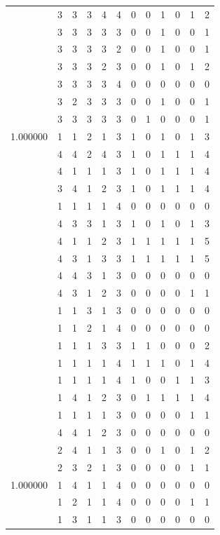 \documentclass[]{book}
\theoremstyle{definition}
\theoremstyle{definition}
\theoremstyle{definition}
\theoremstyle{remark}
\begin{document}
\begin{table}
{\begin{tabular}[t]{rrrrrrrrrrrr}
 & 3 & 3 & 3 & 4 & 4 & 0 & 0 & 1 & 0 & 1 & 2\\
 & 3 & 3 & 3 & 3 & 3 & 0 & 0 & 1 & 0 & 0 & 1\\
 & 3 & 3 & 3 & 3 & 2 & 0 & 0 & 1 & 0 & 0 & 1\\
 & 3 & 3 & 3 & 2 & 3 & 0 & 0 & 1 & 0 & 1 & 2\\
 & 3 & 3 & 3 & 3 & 4 & 0 & 0 & 0 & 0 & 0 & 0\\
 & 3 & 2 & 3 & 3 & 3 & 0 & 0 & 1 & 0 & 0 & 1\\
 & 3 & 3 & 3 & 3 & 3 & 0 & 1 & 0 & 0 & 0 & 1\\
1.000000 & 1 & 1 & 2 & 1 & 3 & 1 & 0 & 1 & 0 & 1 & 3\\
 & 4 & 4 & 2 & 4 & 3 & 1 & 0 & 1 & 1 & 1 & 4\\
 & 4 & 1 & 1 & 1 & 3 & 1 & 0 & 1 & 1 & 1 & 4\\
 & 3 & 4 & 1 & 2 & 3 & 1 & 0 & 1 & 1 & 1 & 4\\
 & 1 & 1 & 1 & 1 & 4 & 0 & 0 & 0 & 0 & 0 & 0\\
 & 4 & 3 & 3 & 1 & 3 & 1 & 0 & 1 & 0 & 1 & 3\\
 & 4 & 1 & 1 & 2 & 3 & 1 & 1 & 1 & 1 & 1 & 5\\
 & 4 & 3 & 1 & 3 & 3 & 1 & 1 & 1 & 1 & 1 & 5\\
 & 4 & 4 & 3 & 1 & 3 & 0 & 0 & 0 & 0 & 0 & 0\\
 & 4 & 3 & 1 & 2 & 3 & 0 & 0 & 0 & 0 & 1 & 1\\
 & 1 & 1 & 3 & 1 & 3 & 0 & 0 & 0 & 0 & 0 & 0\\
 & 1 & 1 & 2 & 1 & 4 & 0 & 0 & 0 & 0 & 0 & 0\\
 & 1 & 1 & 1 & 3 & 3 & 1 & 1 & 0 & 0 & 0 & 2\\
 & 1 & 1 & 1 & 1 & 4 & 1 & 1 & 1 & 0 & 1 & 4\\
 & 1 & 1 & 1 & 1 & 4 & 1 & 0 & 0 & 1 & 1 & 3\\
 & 1 & 4 & 1 & 2 & 3 & 0 & 1 & 1 & 1 & 1 & 4\\
 & 1 & 1 & 1 & 1 & 3 & 0 & 0 & 0 & 0 & 1 & 1\\
 & 4 & 4 & 1 & 2 & 3 & 0 & 0 & 0 & 0 & 0 & 0\\
 & 2 & 4 & 1 & 1 & 3 & 0 & 0 & 1 & 0 & 1 & 2\\
 & 2 & 3 & 2 & 1 & 3 & 0 & 0 & 0 & 0 & 1 & 1\\
1.000000 & 1 & 4 & 1 & 1 & 4 & 0 & 0 & 0 & 0 & 0 & 0\\
 & 1 & 2 & 1 & 1 & 4 & 0 & 0 & 0 & 0 & 1 & 1\\
 & 1 & 3 & 1 & 1 & 3 & 0 & 0 & 0 & 0 & 0 & 0\\

\end{tabular}}
\end{table}
\end{document}
